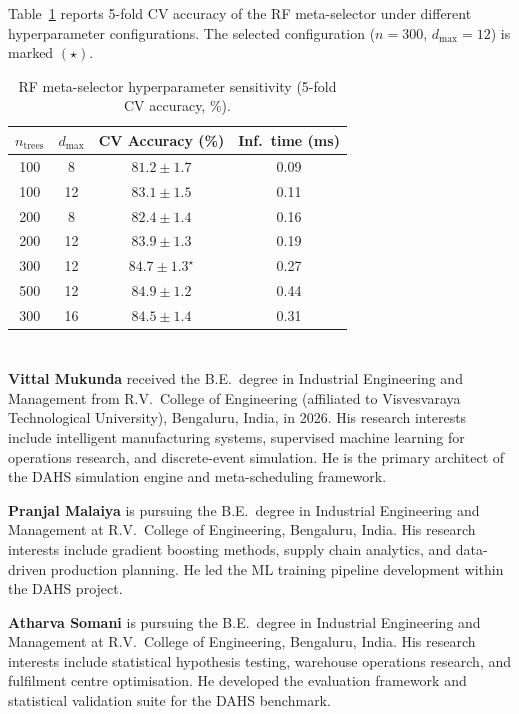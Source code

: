 \documentclass[3p,times]{elsarticle}
\begin{document}
Table~\ref{tab:hparam} reports 5-fold CV accuracy of the RF
meta-selector under different hyperparameter configurations.
The selected configuration ($n{=}300$, $d_{\max}{=}12$) is marked
$(\star)$.

\begin{table}[htbp]
\centering
\caption{RF meta-selector hyperparameter sensitivity
  (5-fold CV accuracy, \%).}
\label{tab:hparam}
\begin{tabular*}{\hsize}{@{\extracolsep{\fill}}cccc@{}}
\toprule
$n_{\text{trees}}$ & $d_{\max}$ &
  CV Accuracy (\%) & Inf.\ time (ms) \\
\midrule
100 & 8  & $81.2\pm1.7$ & 0.09 \\
100 & 12 & $83.1\pm1.5$ & 0.11 \\
200 & 8  & $82.4\pm1.4$ & 0.16 \\
200 & 12 & $83.9\pm1.3$ & 0.19 \\
300 & 12 & $\bm{84.7\pm1.3}^{\star}$ & 0.27 \\
500 & 12 & $84.9\pm1.2$ & 0.44 \\
300 & 16 & $84.5\pm1.4$ & 0.31 \\
\bottomrule
\end{tabular*}
\end{table}


\section*{}   %

\noindent
\textbf{Vittal Mukunda} received the B.E.\ degree in Industrial
Engineering and Management from R.V.\ College of Engineering
(affiliated to Visvesvaraya Technological University), Bengaluru,
India, in 2026.  His research interests include intelligent
manufacturing systems, supervised machine learning for operations
research, and discrete-event simulation.  He is the primary
architect of the DAHS simulation engine and meta-scheduling
framework.

\bigskip
\noindent
\textbf{Pranjal Malaiya} is pursuing the B.E.\ degree in
Industrial Engineering and Management at R.V.\ College of
Engineering, Bengaluru, India.  His research interests include
gradient boosting methods, supply chain analytics, and
data-driven production planning.  He led the ML training pipeline
development within the DAHS project.

\bigskip
\noindent
\textbf{Atharva Somani} is pursuing the B.E.\ degree in
Industrial Engineering and Management at R.V.\ College of
Engineering, Bengaluru, India.  His research interests include
statistical hypothesis testing, warehouse operations research,
and fulfilment centre optimisation.  He developed the evaluation
framework and statistical validation suite for the DAHS benchmark.
\end{document}
